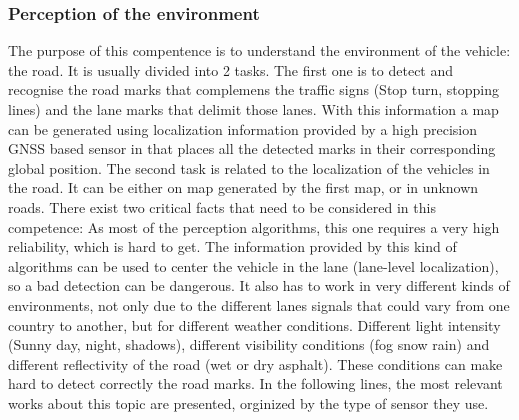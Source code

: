 \subsubsection{Perception of the environment}
The purpose of this compentence is to understand the environment of the vehicle: the road. It is usually divided into 2 tasks.
The first one is to detect and recognise the road marks that complemens the traffic signs (Stop turn, stopping lines) and the lane marks that delimit those lanes. With this information a map can be generated using localization information provided by a high precision GNSS based sensor in that places all the detected marks in their corresponding global position.
The second task is related to the localization of the vehicles in the road. It can be either on map generated by the first map, or in unknown roads. 
There exist two critical facts that need to be considered in this competence: As most of the perception algorithms, this one requires a very high reliability, which is hard to get. The information provided by this kind of algorithms can be used to center the vehicle in the lane (lane-level localization), so a bad detection can be dangerous. It also has to work in very different kinds of environments, not only due to the different lanes signals that could vary from one country to another, but for different weather conditions. Different light intensity (Sunny day, night, shadows), different visibility conditions (fog snow rain) and different reflectivity of the road (wet or dry asphalt). These conditions can make hard to detect correctly the road marks.
In the following lines, the most relevant works about this topic are presented, orginized by the type of sensor they use.


